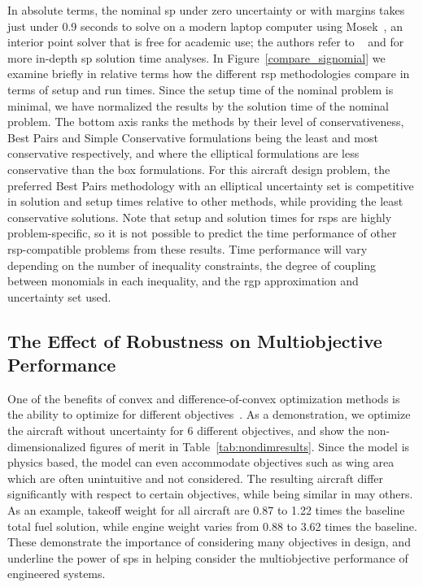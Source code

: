 In absolute
terms, the nominal \gls{sp} under zero uncertainty or with margins
takes just under 0.9 seconds to solve on a modern laptop computer using Mosek~\cite{mosek},
an interior point solver that is free for academic use; the authors
refer to ~\cite{Kirschen2018Log} and \cite{York2018} for more in-depth \gls{sp} solution time analyses.
In Figure~\ref{compare_signomial} we examine briefly in relative terms
how the different \gls{rsp} methodologies compare in terms of setup and
run times. Since the setup time of the nominal problem is minimal,
we have normalized the results by the solution time of the nominal problem.
The bottom axis ranks the methods by their level of conservativeness, Best Pairs
and Simple Conservative formulations being the least and most conservative respectively,
and where the elliptical formulations are less conservative than the box formulations.
{\color{blue}For this aircraft design problem, the preferred Best Pairs methodology
with an elliptical uncertainty set
is competitive in solution and setup times relative to other methods, while providing
the least conservative solutions.}
Note that setup and solution times for \gls{rsp}s are highly problem-specific, so it is not possible
to predict the time performance of other \gls{rsp}-compatible problems from these results.
Time performance will vary depending on the number of inequality constraints,
the degree of coupling between monomials
in each inequality, and the \gls{rgp} approximation and uncertainty set used.

\subsection{The Effect of Robustness on Multiobjective Performance}

One of the benefits of convex and difference-of-convex optimization methods is the ability to optimize for
different objectives~\cite{York2018}. As a demonstration, we optimize the aircraft without uncertainty
for 6 different objectives, and show
the non-dimensionalized figures of merit in Table~\ref{tab:nondimresults}.
Since the model is physics based, {\color{blue}the model can even accommodate objectives such as wing area
which are often unintuitive and not considered. The resulting aircraft
differ significantly with respect to certain objectives, while being similar in may others.
As an example, takeoff weight for all aircraft are 0.87 to 1.22 times the baseline total fuel solution,
while engine weight varies from 0.88 to 3.62 times the baseline.
These demonstrate the importance of considering many objectives
in design, and underline the power of \gls{sp}s in helping
consider the multiobjective performance of engineered systems.}


